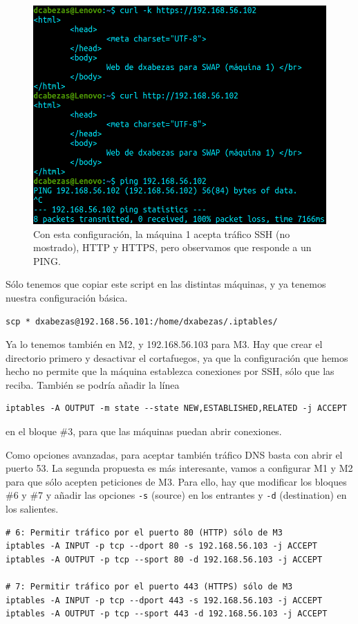 \documentclass{article}
\begin{document}
\begin{figure}[H]
	\centering
	\includegraphics[width=140mm]{imgs/basic}
	\caption{Con esta configuración, la máquina 1 acepta tráfico SSH (no mostrado), HTTP y HTTPS, pero observamos
	que responde a un PING.}
	\label{fig:basic}
\end{figure}

Sólo tenemos que copiar este script en las distintas máquinas, y ya tenemos nuestra configuración básica.
\begin{Verbatim}
scp * dxabezas@192.168.56.101:/home/dxabezas/.iptables/
\end{Verbatim}
Ya lo tenemos también en M2, y 192.168.56.103 para M3. Hay que crear el directorio primero y desactivar el
cortafuegos, ya que la configuración que hemos hecho no permite que la máquina establezca conexiones por SSH, sólo que las reciba.
También se podría añadir la línea
\begin{Verbatim}
iptables -A OUTPUT -m state --state NEW,ESTABLISHED,RELATED -j ACCEPT
\end{Verbatim}
en el bloque \#3, para que las máquinas puedan abrir conexiones.

Como opciones avanzadas, para aceptar también tráfico DNS basta con abrir el puerto 53. La segunda propuesta es
más interesante, vamos a configurar M1 y M2 para que sólo acepten peticiones de M3. Para ello, hay que modificar
los bloques \#6 y \#7 y añadir las opciones \texttt{-s} (source) en los entrantes y \texttt{-d} (destination)
en los salientes.

\begin{Verbatim}
# 6: Permitir tráfico por el puerto 80 (HTTP) sólo de M3
iptables -A INPUT -p tcp --dport 80 -s 192.168.56.103 -j ACCEPT
iptables -A OUTPUT -p tcp --sport 80 -d 192.168.56.103 -j ACCEPT

# 7: Permitir tráfico por el puerto 443 (HTTPS) sólo de M3
iptables -A INPUT -p tcp --dport 443 -s 192.168.56.103 -j ACCEPT
iptables -A OUTPUT -p tcp --sport 443 -d 192.168.56.103 -j ACCEPT
\end{Verbatim}
\end{document}

